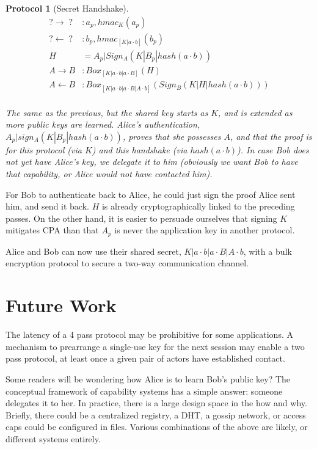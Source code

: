 \documentclass[12pt]{article}
\newtheorem{proto}{Protocol}
\begin{document}
\begin{samepage}
\begin{proto}[Secret Handshake]

  $$
  \begin{align*}
      ? \to \;?\;   &: a_{p}, hmac_{K}(a_{p})   \\
      ? \gets \;?\; &: b_{p}, hmac_{[K|a\cdot b]}(b_{p}) \\
      H&=A_{p}|Sign_A(K|B_{p}|hash(a\cdot b)) \\
      A \to B       &: Box_{[K|a \cdot b | a \cdot B]}(H)\\
      A \gets B     &:
        Box_{[K|a \cdot b | a \cdot B | A \cdot b]}(Sign_B(K|H|hash(a\cdot b)) )\\
  \end{align*}
  $$

  The same as the previous, but the shared key starts
  as $K$, and is extended as more public keys are learned.
  Alice's authentication, $A_{p}|sign_A(K|B_p|hash(a\cdot b))$,
  proves that she possesses $A$, and that the proof is for this protocol
  (via $K$) and this handshake (via $hash(a\cdot b)$).
  In case Bob does not yet have Alice's key, we delegate it to him
  (obviously we want Bob to have that capability, or Alice would not have
  contacted him).
\end{proto}
\end{samepage}

For Bob to authenticate back to Alice, he could just sign the proof
Alice sent him, and send it back. $H$ is already cryptographically
linked to the preceding passes. On the other hand, it is easier to
persuade ourselves that signing $K$ mitigates CPA\cite{cpa} than that
$A_p$ is never the application key in another protocol.

Alice and Bob can now use their shared secret,
$K|a \cdot b|a \cdot B|A \cdot b$, with a bulk encryption protocol
to secure a two-way communication channel.

\section{Future Work}

The latency of a 4 pass protocol may be prohibitive for some
applications. A mechanism to prearrange a single-use
key for the next session may enable a two pass protocol, at least
once a given pair of actors have established contact.

Some readers will be wondering how Alice is to learn Bob's public key?
The conceptual framework of capability systems has a simple answer:
someone delegates it to her. In practice, there is a large design space
in the how and why.
Briefly, there could be a centralized registry, a DHT, a gossip network,
or access caps could be configured in files. Various combinations of
the above are likely, or different systems entirely.
\end{document}
